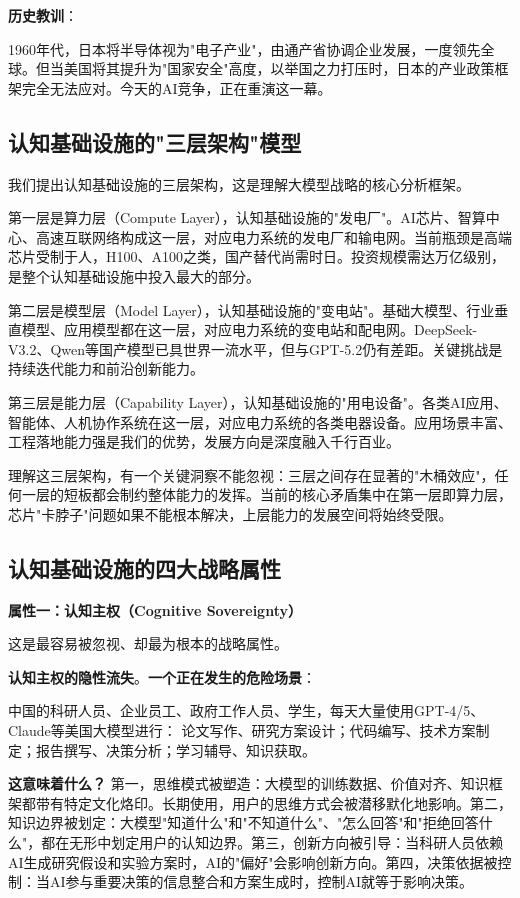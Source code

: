 \textbf{历史教训}：

1960年代，日本将半导体视为"电子产业"，由通产省协调企业发展，一度领先全球。但当美国将其提升为"国家安全"高度，以举国之力打压时，日本的产业政策框架完全无法应对。今天的AI竞争，正在重演这一幕。

\subsection{认知基础设施的"三层架构"模型}

我们提出认知基础设施的三层架构，这是理解大模型战略的核心分析框架。

第一层是算力层（Compute Layer），认知基础设施的"发电厂"。AI芯片、智算中心、高速互联网络构成这一层，对应电力系统的发电厂和输电网。当前瓶颈是高端芯片受制于人，H100、A100之类，国产替代尚需时日。投资规模需达万亿级别，是整个认知基础设施中投入最大的部分。

第二层是模型层（Model Layer），认知基础设施的"变电站"。基础大模型、行业垂直模型、应用模型都在这一层，对应电力系统的变电站和配电网。DeepSeek-V3.2、Qwen等国产模型已具世界一流水平，但与GPT-5.2仍有差距。关键挑战是持续迭代能力和前沿创新能力。

第三层是能力层（Capability Layer），认知基础设施的"用电设备"。各类AI应用、智能体、人机协作系统在这一层，对应电力系统的各类电器设备。应用场景丰富、工程落地能力强是我们的优势，发展方向是深度融入千行百业。

理解这三层架构，有一个关键洞察不能忽视：三层之间存在显著的"木桶效应"，任何一层的短板都会制约整体能力的发挥。当前的核心矛盾集中在第一层即算力层，芯片"卡脖子"问题如果不能根本解决，上层能力的发展空间将始终受限。

\subsection{认知基础设施的四大战略属性}

\textbf{属性一：认知主权（Cognitive Sovereignty）}

这是最容易被忽视、却最为根本的战略属性。

\textbf{认知主权的隐性流失}。\textbf{一个正在发生的危险场景}：

中国的科研人员、企业员工、政府工作人员、学生，每天大量使用GPT-4/5、Claude等美国大模型进行：
论文写作、研究方案设计；代码编写、技术方案制定；报告撰写、决策分析；学习辅导、知识获取。

\textbf{这意味着什么？}
第一，思维模式被塑造：大模型的训练数据、价值对齐、知识框架都带有特定文化烙印。长期使用，用户的思维方式会被潜移默化地影响。第二，知识边界被划定：大模型"知道什么"和"不知道什么"、"怎么回答"和"拒绝回答什么"，都在无形中划定用户的认知边界。第三，创新方向被引导：当科研人员依赖AI生成研究假设和实验方案时，AI的"偏好"会影响创新方向。第四，决策依据被控制：当AI参与重要决策的信息整合和方案生成时，控制AI就等于影响决策。

